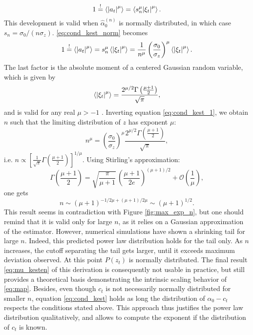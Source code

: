 \documentclass[FinalReport.tex]{subfiles}
\begin{document}
\begin{equation}\label{eq:cond_kest_norm}
	1\stackrel{!}{=}\expval{\abs{a_t}^\mu}=\expval{s_n^\mu \abs{\xi_t}^\mu}.
\end{equation}
This development is valid when $\hat{\alpha}_0^{(n)}$ is normally distributed, in which case $s_n=\sigma_0/(n\sigma_z)$. \eqref{eq:cond_kest_norm} becomes
\begin{equation}\label{eq:cond_kest_1}
	1\stackrel{!}{=}\expval{\abs{a_t}^\mu}=s_n^\mu\expval{ \abs{\xi_t}^\mu}=\frac{1}{n^\mu} \left(\frac{\sigma_0}{\sigma_z}\right)^\mu\expval{\abs{\xi_t}^\mu}.
\end{equation}
The last factor is the absolute moment of a centered Gaussian random variable, which is given by
\begin{equation}
	\expval{\abs{\xi_t}^\mu}= \frac{2^{\mu/2}\Gamma\left(\frac{\mu+1} 2 \right)}{\sqrt\pi},
\end{equation}
and is valid for any real $\mu>-1$ \cite{moments}. Inverting equation \eqref{eq:cond_kest_1}, we obtain $n$ such that the limiting distribution of $z$ has exponent $\mu$:
\begin{equation}
	n^\mu=\left(\frac{\sigma_0}{\sigma_z}\right)^\mu\frac{2^{\mu/2}\Gamma\left(\frac{\mu+1} 2 \right)}{\sqrt\pi},
\end{equation}
i.e. $n\propto \left[\frac{1}{\sqrt{\pi}} \Gamma\left(\frac{\mu+1} 2 \right)\right]^{1/\mu} $. Using Stirling's approximation:
\begin{equation}
	\Gamma\left(\frac{\mu+1}{2}\right)=\sqrt{\frac{\pi}{\mu+1}}\,{\left(\frac{\mu+1}{2e}\right)}^{(\mu+1)/2} +\mathcal{O}\left(\frac{1}{\mu}\right), 
\end{equation}
one gets
\begin{equation}\label{eq:mu_kesten}
	n\sim (\mu+1)^{-1/2\mu + (\mu+1)/2\mu}\sim (\mu+1)^{1/2}.
\end{equation}
This result seems in contradiction with Figure \ref{fig:max_exp_n}, but one should remind that it is valid only for large $n$, as it relies on a Gaussian approximation of the estimator. However, numerical simulations have shown a shrinking tail for large $n$. Indeed, this predicted power law distribution holds for the tail only. As $n$ increases, the cutoff separating the tail gets larger, until it exceeds maximum deviation observed. At this point $P(z_t)$ is normally distributed. The final result \eqref{eq:mu_kesten} of this derivation is consequently not usable in practice, but still provides a theoretical basis demonstrating the intrinsic scaling behavior of \eqref{eq:map}. Besides, even though $c_t$ is not necessarily normally distributed for smaller $n$, equation \eqref{eq:cond_kest} holds as long the distribution of $\alpha_0-c_t$ respects the conditions stated above. This approach thus justifies the power law distribution qualitatively, and allows to compute the exponent if the distribution of $c_t$ is known.
  
\end{document}

